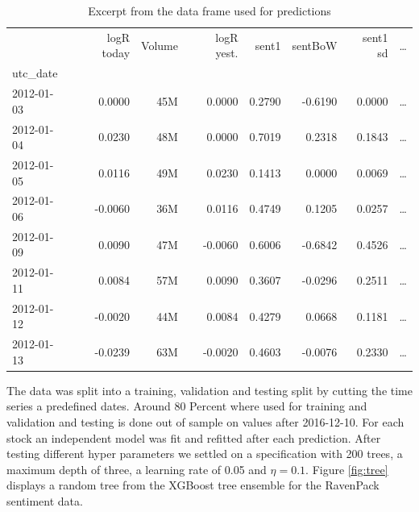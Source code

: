 \begin{table}[h]
\centering
\begin{tabular}{lrrrrrrr}
\toprule
{} &  logR today &  Volume &  logR yest. &  sent1 &  sentBoW &  sent1 sd &  \dots \\
utc\_date   &              &             &                     &             &               &           &                   \\
\midrule
2012-01-03 &       0.0000 &  45M &           0.0000 &      0.2790 &       -0.6190 &    0.0000 &         \dots \\
2012-01-04 &       0.0230 &  48M &              0.0000 &      0.7019 &        0.2318 &    0.1843 &      \dots \\
2012-01-05 &       0.0116 &  49M &              0.0230 &      0.1413 &        0.0000 &    0.0069 &      \dots \\
2012-01-06 &      -0.0060 &  36M &              0.0116 &      0.4749 &        0.1205 &    0.0257 &      \dots\\
2012-01-09 &       0.0090 &  47M &             -0.0060 &      0.6006 &       -0.6842 &    0.4526 &      \dots \\
2012-01-11 &       0.0084 &  57M &              0.0090 &      0.3607 &       -0.0296 &    0.2511 &      \dots \\
2012-01-12 &      -0.0020 &  44M &              0.0084 &      0.4279 &        0.0668 &    0.1181 &      \dots \\
2012-01-13 &      -0.0239 &  63M &             -0.0020 &      0.4603 &       -0.0076 &    0.2330 &      \dots \\
\bottomrule
\end{tabular}
    \label{tab:predictionFrame}
    \caption{Excerpt from the data frame used for predictions}
\end{table} 
The data was split into a training, validation and testing split by cutting the time series a predefined dates. Around 80 Percent where used for training and validation and testing is done out of sample on values after 2016-12-10. For each stock an independent model was fit and refitted after each prediction. After testing different hyper parameters we settled on a specification with 200 trees, a maximum depth of three, a learning rate of 0.05 and $\eta = 0.1$. Figure \ref{fig:tree} displays a random tree from the XGBoost tree ensemble for the RavenPack sentiment data. \\ 

